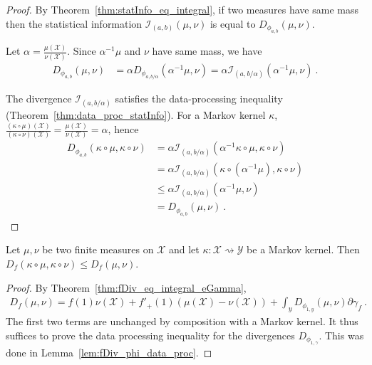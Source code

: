 \begin{proof}%
{}
By Theorem~\ref{thm:statInfo_eq_integral}, if two measures have same mass then the statistical information $\mathcal I_{(a,b)}(\mu, \nu)$ is equal to $D_{\phi_{a,b}}(\mu, \nu)$.

Let $\alpha = \frac{\mu(\mathcal X)}{\nu(\mathcal X)}$. Since $\alpha^{-1}\mu$ and $\nu$ have same mass, we have
\begin{align*}
D_{\phi_{a,b}}(\mu, \nu)
&= \alpha D_{\phi_{a,b/\alpha}}(\alpha^{-1}\mu, \nu)
= \alpha \mathcal I_{(a, b/\alpha)}(\alpha^{-1}\mu, \nu)
\: .
\end{align*}

The divergence $\mathcal I_{(a,b/\alpha)}$ satisfies the data-processing inequality (Theorem~\ref{thm:data_proc_statInfo}).
For a Markov kernel $\kappa$, $\frac{(\kappa \circ \mu)(\mathcal X)}{( \kappa \circ \nu)(\mathcal X)} = \frac{\mu(\mathcal X)}{\nu(\mathcal X)} = \alpha$, hence
\begin{align*}
D_{\phi_{a,b}}(\kappa \circ \mu, \kappa \circ \nu)
&= \alpha \mathcal I_{(a, b/\alpha)}(\alpha^{-1}\kappa \circ \mu, \kappa \circ \nu)
\\
&= \alpha \mathcal I_{(a, b/\alpha)}(\kappa \circ (\alpha^{-1}\mu), \kappa \circ \nu)
\\
&\le \alpha \mathcal I_{(a, b/\alpha)}(\alpha^{-1}\mu, \nu)
\\
&= D_{\phi_{a,b}}(\mu, \nu)
\: .
\end{align*}
\end{proof}

\begin{theorem}
  \label{thm:fDiv_data_proc_2}
  Let $\mu, \nu$ be two finite measures on $\mathcal X$ and let $\kappa : \mathcal X \rightsquigarrow \mathcal Y$ be a Markov kernel.
  Then $D_f(\kappa \circ \mu, \kappa \circ \nu) \le D_f(\mu, \nu)$.
\end{theorem}

\begin{proof}%
{}
By Theorem~\ref{thm:fDiv_eq_integral_eGamma},
\begin{align*}
D_f(\mu, \nu) = f(1) \nu(\mathcal X) + f'_+(1) (\mu(\mathcal X) - \nu (\mathcal X)) + \int_y D_{\phi_{1,y}}(\mu, \nu) \partial\gamma_f \: .
\end{align*}
The first two terms are unchanged by composition with a Markov kernel. It thus suffices to prove the data processing inequality for the divergences $D_{\phi_{1, \gamma}}$. This was done in Lemma~\ref{lem:fDiv_phi_data_proc}.
\end{proof}


